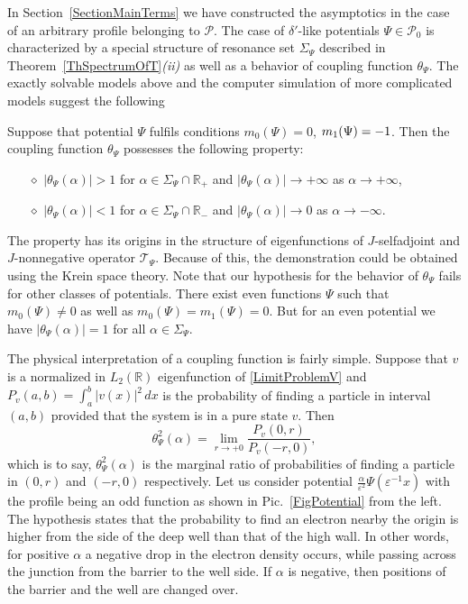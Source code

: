 \documentclass[11pt,english]{amsart}%
\begin{document}
In Section~\ref{SectionMainTerms} we have constructed the asymptotics in the case of an arbitrary profile belonging to $\mathcal{P}$. The case of $\delta'$-like potentials $\Psi\in \mathcal{P}_0$ is characterized by a special structure of resonance set $\Sigma_\Psi$  described in Theorem~\ref{ThSpectrumOfT}\textit{(ii)} as well as a behavior of  coupling function $\theta_\Psi$. The exactly solvable models above and the computer simulation of more complicated models suggest the following
\begin{g_hyp} Suppose that potential $\Psi$ fulfils conditions $m_0(\Psi)=0$, $m_1(\Psi)\break=-1$.
Then the coupling function $\theta_\Psi$   possesses   the following property:
\begin{itemize}
  \item[$\diamond$] $|\theta_\Psi(\alpha)|>1$ for $\alpha\in \Sigma_\Psi\cap \mathbb R_+$ and $|\theta_\Psi(\alpha)|\to +\infty$ as $\alpha\to +\infty$,
  \item[$\diamond$] $|\theta_\Psi(\alpha)|<1$ for $\alpha\in \Sigma_\Psi\cap \mathbb R_-$ and $|\theta_\Psi(\alpha)|\to 0$ as $\alpha\to -\infty$.
\end{itemize}
\end{g_hyp}
The property has its origins in the structure of eigenfunctions of
$J$-selfadjoint and $J$-nonnegative operator $\mathcal{T}_\Psi$. Because of this, the demonstration could be obtained using the Krein space theory. Note that our hypothesis for the behavior of  $\theta_\Psi$  fails for other classes of potentials. There exist even functions $\Psi$ such that $m_0(\Psi)\neq 0$ as well as
$m_0(\Psi)=m_1(\Psi)=0$. But  for an even potential we have $|\theta_\Psi(\alpha)|=1$ for all $\alpha\in \Sigma_\Psi$.

The physical interpretation of a coupling function is fairly simple.
Suppose that $v$ is  a normalized in $L_2(\mathbb{R})$ eigenfunction of  \eqref{LimitProblemV} and
$P_v(a,b)=\int_a^b |v(x)|^2\,dx$ is the probability of finding a particle in  interval $(a,b)$ provided that the system is in a pure state $v$. Then
\begin{equation*}
    \theta_\Psi ^2(\alpha)=\lim\limits_{r\to +0}\frac{P_v(0,r)}{P_v(-r,0)},
\end{equation*}
which is to say,  $\theta_\Psi ^2(\alpha)$ is the marginal ratio of probabilities of finding a particle in
$(0,r)$ and $(-r, 0)$ respectively. Let us consider potential $\frac{\alpha}{\varepsilon^{2}}\Psi(\varepsilon^{-1}x)$ with the profile  being an odd function as shown in Pic.~\ref{FigPotential} from the left.
The hypothesis states that the probability to find an electron nearby the origin is higher from the side of the deep well than that of the high wall. In other words, for  positive $\alpha$ a negative drop in the electron density occurs, while passing across the junction from the barrier to the well side. If $\alpha$ is negative, then positions of the barrier and the well are changed over.
\end{document}
